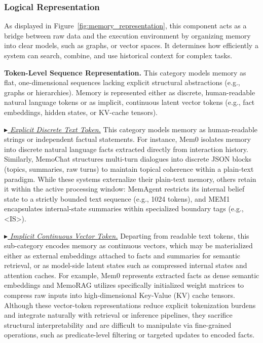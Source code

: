 \documentclass{llmxive}
\begin{document}
\subsubsection{\textbf{Logical Representation}}
As displayed in Figure~\ref{fig:memory_representation}, this component acts as a bridge between raw data and the execution environment by organizing memory into clear models, such as graphs, or vector spaces.
It determines how efficiently a system can search, combine, and use historical context for complex tasks.

\noindent  \textbf{Token-Level Sequence Representation.} This category models memory as flat, one-dimensional sequences lacking explicit structural abstractions (e.g., graphs or hierarchies). Memory is represented either as discrete, human-readable natural language tokens or as implicit, continuous latent vector tokens (e.g., fact embeddings, hidden states, or KV-cache tensors).

\noindent \underline{\textit{$\blacktriangleright$ Explicit Discrete Text Token.}}
This category models memory as human-readable strings or independent factual statements.
For instance, Mem0 isolates memory into discrete natural language facts extracted directly from interaction history. Similarly, MemoChat structures multi-turn dialogues into discrete JSON blocks (topics, summaries, raw turns) to maintain topical coherence within a plain-text paradigm. While these systems externalize their plain-text memory, others retain it within the active processing window: MemAgent restricts its internal belief state to a strictly bounded text sequence (e.g., 1024 tokens), and MEM1 encapsulates internal-state summaries within specialized boundary tags (e.g., <IS>).

\begin{sloppypar}
\noindent \underline{\textit{$\blacktriangleright$ Implicit Continuous Vector Token.}}
Departing from readable text tokens, this sub-category encodes memory as continuous vectors, which may be materialized either as external embeddings attached to facts and summaries for semantic retrieval, or as model-side latent states such as compressed internal states and attention caches.
For example, Mem0 represents extracted facts as dense semantic embeddings and MemoRAG utilizes specifically initialized weight matrices to compress raw inputs into high-dimensional Key-Value (KV) cache tensors. 
Although these vector-token representations reduce explicit tokenization burdens and integrate naturally with retrieval or inference pipelines, they sacrifice structural interpretability and are difficult to manipulate via fine-grained operations, such as predicate-level filtering or targeted updates to encoded facts.
\end{sloppypar}
\end{document}
